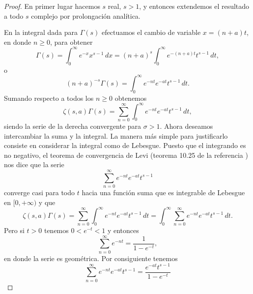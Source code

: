 \documentclass[12pt,a4paper]{book}
\begin{document}
    \begin{proof}
        En primer lugar hacemos $s$ real, $s>1$, y entonces extendemos el resultado a todo $s$
        complejo por prolongación analítica.

        En la integral dada para $\Gamma(s)$ efectuamos el cambio de variable $x=(n+a)t$, en
        donde $n\geq0$, para obtener
        \begin{equation*}
            \Gamma(s)=\int_{0}^{\infty}e^{-x}x^{s-1}\,dx=(n+a)^{s}\int_{0}^{\infty}e^{-(n+a)t}t^{s-1}\,dt,
        \end{equation*}
        o
        \begin{equation*}
            (n+a)^{-s}\Gamma(s)=\int_{0}^{\infty}e^{-nt}e^{-at}t^{s-1}\,dt.
        \end{equation*}
        Sumando respecto a todos los $n\geq0$ obtenemos
        \begin{equation*}
            \zeta(s,a)\Gamma(s)=\sum_{n=0}^{\infty}\int_{0}^{\infty}e^{-nt}e^{-at}t^{s-1}\,dt,
        \end{equation*}
        siendo la serie de la derecha convergente para $\sigma>1$. Ahora deseamos intercambiar
        la suma y la integral. La manera más simple para justificarlo consiste en considerar la
        integral como de Lebesgue. Puesto que el integrando es no negativo, el teorema de
        convergencia de Levi (teorema 10.25 de la referencia \cite{apostol1976}) nos dice que la serie
        \begin{equation*}
            \sum_{n=0}^{\infty}e^{-nt}e^{-at}t^{s-1}
        \end{equation*}
        converge casi para todo $t$ hacia una función suma que es integrable de Lebesgue en
        $[0,+\infty)$ y que
        \begin{equation*}
            \zeta(s,a)\Gamma(s)=\sum_{n=0}^{\infty}\int_{0}^{\infty}e^{-nt}e^{-at}t^{s-1}\,dt=\int_{0}^{\infty}\sum_{n=0}^{\infty}e^{-nt}e^{-at}t^{s-1}\,dt.
        \end{equation*}
        Pero si $t>0$ tenemos $0<e^{-t}<1$ y entonces
        \begin{equation*}
            \sum_{n=0}^{\infty}e^{-nt}=\frac{1}{1-e^{-t}},
        \end{equation*}
        en donde la serie es geométrica. Por consiguiente tenemos
        \begin{equation*}
            \sum_{n=0}^{\infty}e^{-nt}e^{-at}t^{s-1}=\frac{e^{-at}t^{s-1}}{1-e^{-t}}
        \end{equation*}

\end{proof}
\end{document}
